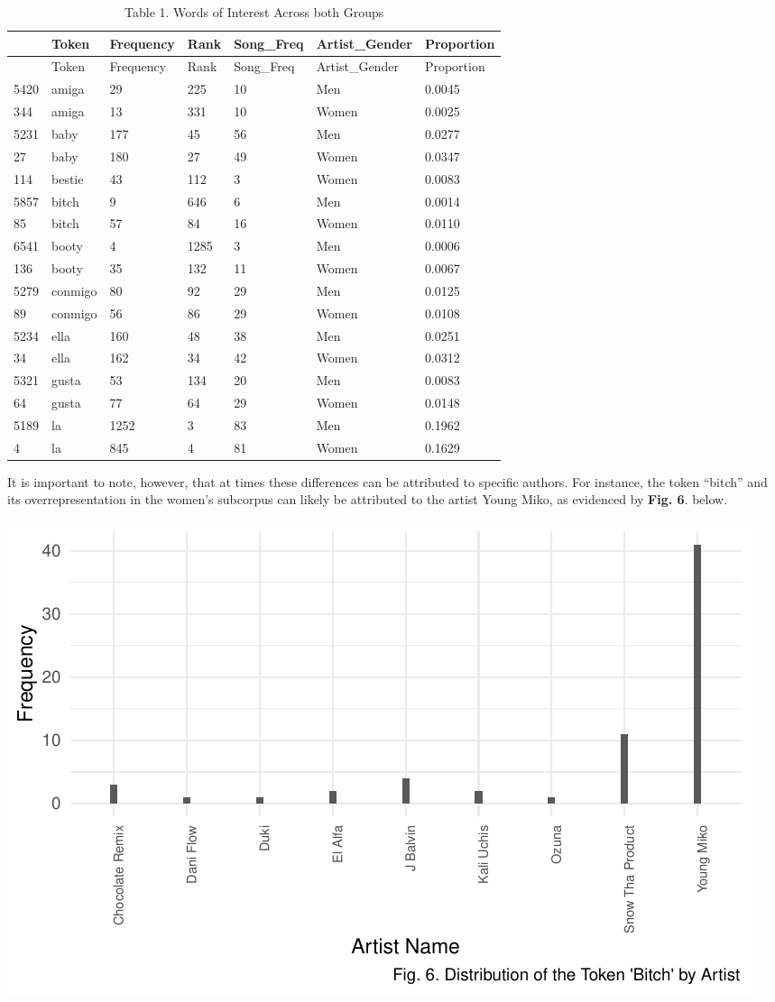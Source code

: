 \documentclass[
  letterpaper,
  DIV=11,
  numbers=noendperiod]{scrartcl}
\begin{document}
\begin{longtable}[]{@{}lllllll@{}}
\caption{Table 1. Words of Interest Across both Groups}\tabularnewline
\toprule()
& Token & Frequency & Rank & Song\_Freq & Artist\_Gender & Proportion \\
\midrule()
\endfirsthead
\toprule()
& Token & Frequency & Rank & Song\_Freq & Artist\_Gender & Proportion \\
\midrule()
\endhead
5420 & amiga & 29 & 225 & 10 & Men & 0.0045 \\
344 & amiga & 13 & 331 & 10 & Women & 0.0025 \\
5231 & baby & 177 & 45 & 56 & Men & 0.0277 \\
27 & baby & 180 & 27 & 49 & Women & 0.0347 \\
114 & bestie & 43 & 112 & 3 & Women & 0.0083 \\
5857 & bitch & 9 & 646 & 6 & Men & 0.0014 \\
85 & bitch & 57 & 84 & 16 & Women & 0.0110 \\
6541 & booty & 4 & 1285 & 3 & Men & 0.0006 \\
136 & booty & 35 & 132 & 11 & Women & 0.0067 \\
5279 & conmigo & 80 & 92 & 29 & Men & 0.0125 \\
89 & conmigo & 56 & 86 & 29 & Women & 0.0108 \\
5234 & ella & 160 & 48 & 38 & Men & 0.0251 \\
34 & ella & 162 & 34 & 42 & Women & 0.0312 \\
5321 & gusta & 53 & 134 & 20 & Men & 0.0083 \\
64 & gusta & 77 & 64 & 29 & Women & 0.0148 \\
5189 & la & 1252 & 3 & 83 & Men & 0.1962 \\
4 & la & 845 & 4 & 81 & Women & 0.1629 \\
\bottomrule()
\end{longtable}

It is important to note, however, that at times these differences can be
attributed to specific authors. For instance, the token ``bitch'' and
its overrepresentation in the women's subcorpus can likely be attributed
to the artist Young Miko, as evidenced by \textbf{Fig. 6}. below.

\includegraphics{Sastoque_Essay3_files/figure-pdf/by-author-1.pdf}
\end{document}
